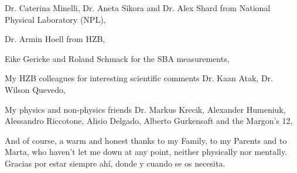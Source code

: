 \noindent Dr. Caterina Minelli, Dr. Aneta Sikora and Dr. Alex Shard from National Physical Laboratory (NPL),
\vspace{2ex}

\noindent Dr. Armin Hoell from HZB,
\vspace{2ex}

\noindent Eike Gericke and Roland Schmack for the SBA measurements,
\vspace{2ex}

\noindent My HZB colleagues for interesting scientific comments Dr. Kaan Atak, Dr. Wilson Quevedo,
\vspace{2ex}

\noindent My physics and non-physics friends Dr. Markus Krecik, Alexander Humeniuk, Alessandro Riccotone, Alisio Delgado, Alberto Gurkensaft and the Margon's 12,
\vspace{2ex}

\noindent And of course, a warm and honest thanks to my Family, to my Parents and to Marta, who haven't let me down at any point, neither physically nor mentally. Gracias por estar siempre ahí, donde y cuando se os necesita.

\cleardoublepage
